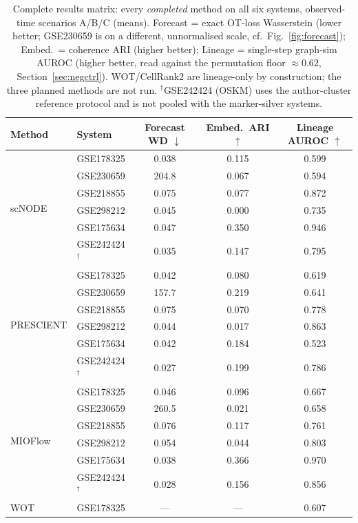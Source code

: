 \documentclass[11pt]{article}
\begin{document}
\begin{table}[ht]
\centering
\caption{Complete results matrix: every \emph{completed} method on all six systems, observed-time scenarios A/B/C (means). Forecast = exact OT-loss Wasserstein (lower better; GSE230659 is on a different, unnormalised scale, cf.\ Fig.~\ref{fig:forecast}); Embed.\ = coherence ARI (higher better); Lineage = single-step graph-sim AUROC (higher better, read against the permutation floor $\approx0.62$, Section~\ref{sec:negctrl}). WOT/CellRank2 are lineage-only by construction; the three planned methods are not run. $^{\dagger}$GSE242424 (OSKM) uses the author-cluster reference protocol and is not pooled with the marker-silver systems.}
\label{tab:master}
\small
\begin{tabular}{l l c c c}
\toprule
Method & System & Forecast WD $\downarrow$ & Embed.\ ARI $\uparrow$ & Lineage AUROC $\uparrow$ \\
\midrule
\multirow{6}{*}{scNODE} & GSE178325 & 0.038 & 0.115 & 0.599 \\
 & GSE230659 & 204.8 & 0.067 & 0.594 \\
 & GSE218855 & 0.075 & 0.077 & 0.872 \\
 & GSE298212 & 0.045 & 0.000 & 0.735 \\
 & GSE175634 & 0.047 & 0.350 & 0.946 \\
 & GSE242424$^{\dagger}$ & 0.035 & 0.147 & 0.795 \\
\midrule
\multirow{6}{*}{PRESCIENT} & GSE178325 & 0.042 & 0.080 & 0.619 \\
 & GSE230659 & 157.7 & 0.219 & 0.641 \\
 & GSE218855 & 0.075 & 0.070 & 0.778 \\
 & GSE298212 & 0.044 & 0.017 & 0.863 \\
 & GSE175634 & 0.042 & 0.184 & 0.523 \\
 & GSE242424$^{\dagger}$ & 0.027 & 0.199 & 0.786 \\
\midrule
\multirow{6}{*}{MIOFlow} & GSE178325 & 0.046 & 0.096 & 0.667 \\
 & GSE230659 & 260.5 & 0.021 & 0.658 \\
 & GSE218855 & 0.076 & 0.117 & 0.761 \\
 & GSE298212 & 0.054 & 0.044 & 0.803 \\
 & GSE175634 & 0.038 & 0.366 & 0.970 \\
 & GSE242424$^{\dagger}$ & 0.028 & 0.156 & 0.856 \\
\midrule
\multirow{6}{*}{WOT} & GSE178325 & --- & --- & 0.607 \\

\end{tabular}
\end{table}
\end{document}
